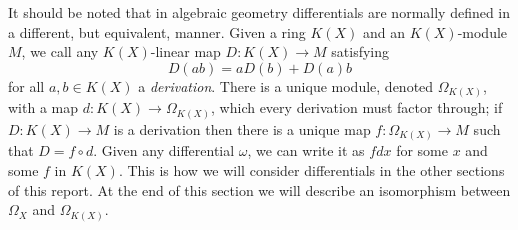 It should be noted that in algebraic geometry differentials are normally defined in a different, but equivalent, manner.
Given a ring $K(X)$ and an $K(X)$-module $M$, we call any $K(X)$-linear map $D\colon K(X)\rightarrow M$ satisfying 
    \[
    D(ab) = aD(b) + D(a)b
    \]
for all $a,b\in K(X)$ a {\em derivation}.
There is a unique module, denoted $\Omega_{K(X)}$, with a map $d\colon K(X) \rightarrow \Omega_{K(X)}$, which every derivation must factor through; \ie if $D\colon K(X)\rightarrow M$ is a derivation then there is a unique map $f\colon \Omega_{K(X)}\rightarrow M$ such that $D = f\circ d$.
Given any differential $\omega$, we can write it as $fdx$ for some $x$ and some $f$ in $K(X)$.
This is how we will consider differentials in the other sections of this report.
At the end of this section we will describe an isomorphism between $\Omega_X$ and $\Omega_{K(X)}$.


